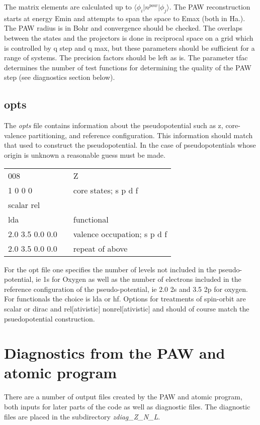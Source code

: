 \documentclass[11pt]{report}
\begin{document}
The matrix elements are calculated up to $\langle \phi_i \vert n^{pow} \vert \phi_j \rangle$. The PAW reconstruction starts at energy Emin and attempts to span the space to Emax (both in Ha.). 
The PAW radius is in Bohr and convergence should be checked. The overlaps between the states and the projectors is done in reciprocal space on a grid which is controlled by q step and q max, but these parameters should be sufficient for a range of systems. The precision factors should be left as is. The parameter tfac determines the number of test functions for determining the quality of the PAW step (see diagnostics section below).


\subsection{opts}
\label{opts}
The \emph{opts} file contains information about the pseudopotential such as z, core-valence partitioning, and reference configuration. This information should match that used to construct the pseudopotential. In the case of pseudopotentials 
whose origin is unknown a reasonable guess must be made.

\begin{center}
\begin{tabular}{| l | c l |}
\hline
008				& &  Z\\
1 0 0 0			& & core states; s p d f \\
scalar rel			& & \\
lda				& & functional \\
2.0 3.5 0.0 0.0		& & valence occupation; s p d f \\
2.0 3.5 0.0 0.0		& & repeat of above \\
\hline
\end{tabular}
\end{center}

For the opt file one specifies the number of levels not included in the pseudo-potential, ie 1s for Oxygen as well as the number of electrons included in the reference configuration of the pseudo-potential, ie 2.0 2s and 3.5 2p for oxygen. For functionals the choice is lda or hf. Options for treatments of spin-orbit are 
scalar or dirac and rel[ativistic] nonrel[ativistic] and should of course match the psuedopotential 
construction. 

\section{Diagnostics from the PAW and atomic program}
There are a number of output files created by the PAW and atomic program, both inputs for later parts of the code as well as diagnostic files. The diagnostic files are placed in the subdirectory \emph{zdiag\_Z\_N\_L}. 
\end{document}

